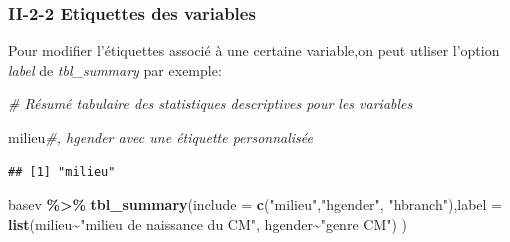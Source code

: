 \documentclass[
]{article}
\newenvironment{Shaded}{\begin{snugshade}}{\end{snugshade}}
\newcommand{\AttributeTok}[1]{\textcolor[rgb]{0.13,0.29,0.53}{#1}}
\newcommand{\CommentTok}[1]{\textcolor[rgb]{0.56,0.35,0.01}{\textit{#1}}}
\newcommand{\FunctionTok}[1]{\textcolor[rgb]{0.13,0.29,0.53}{\textbf{#1}}}
\newcommand{\NormalTok}[1]{#1}
\newcommand{\SpecialCharTok}[1]{\textcolor[rgb]{0.81,0.36,0.00}{\textbf{#1}}}
\newcommand{\StringTok}[1]{\textcolor[rgb]{0.31,0.60,0.02}{#1}}
\begin{document}
\hypertarget{ii-2-2-etiquettes-des-variables}{%
\subsubsection{II-2-2 Etiquettes des
variables}\label{ii-2-2-etiquettes-des-variables}}

Pour modifier l'étiquettes associé à une certaine variable,on peut
utliser l'option \emph{label} de \emph{tbl\_summary} par exemple:

\begin{Shaded}
\begin{Highlighting}[]
\CommentTok{\# Résumé tabulaire des statistiques descriptives pour les variables }

\StringTok{\textquotesingle{}milieu\textquotesingle{}}\CommentTok{\#, hgender avec une étiquette personnalisée}
\end{Highlighting}
\end{Shaded}

\begin{verbatim}
## [1] "milieu"
\end{verbatim}

\begin{Shaded}
\begin{Highlighting}[]
\NormalTok{basev }\SpecialCharTok{\%\textgreater{}\%}
  \FunctionTok{tbl\_summary}\NormalTok{(}\AttributeTok{include =} \FunctionTok{c}\NormalTok{(}\StringTok{"milieu"}\NormalTok{,}\StringTok{"hgender"}\NormalTok{, }\StringTok{"hbranch"}\NormalTok{),}\AttributeTok{label =} 
                \FunctionTok{list}\NormalTok{(milieu}\SpecialCharTok{\textasciitilde{}}\StringTok{"milieu de naissance du CM"}\NormalTok{, hgender}\SpecialCharTok{\textasciitilde{}}\StringTok{"genre CM"}\NormalTok{)  )}
\end{Highlighting}
\end{Shaded}
\end{document}
